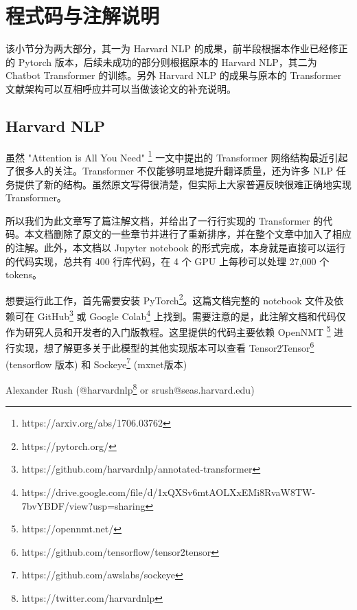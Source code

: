 \section{程式码与注解说明}

该小节分为两大部分，其一为 Harvard NLP 的成果，前半段根据本作业已经修正的 Pytorch 版本，后续未成功的部分则根据原本的 Harvard NLP，其二为 Chatbot Transformer 的训练。另外 Harvard NLP 的成果与原本的 Transformer 文献架构可以互相呼应并可以当做该论文的补充说明。

\subsection{Harvard NLP}

虽然 "Attention is All You Need" \footnote{https://arxiv.org/abs/1706.03762} 一文中提出的 Transformer 网络结构最近引起了很多人的关注。Transformer 不仅能够明显地提升翻译质量，还为许多 NLP 任务提供了新的结构。虽然原文写得很清楚，但实际上大家普遍反映很难正确地实现 Transformer。

所以我们为此文章写了篇注解文档，并给出了一行行实现的 Transformer 的代码。本文档删除了原文的一些章节并进行了重新排序，并在整个文章中加入了相应的注解。此外，本文档以 Jupyter notebook 的形式完成，本身就是直接可以运行的代码实现，总共有 400 行库代码，在 4 个 GPU 上每秒可以处理 27,000 个 tokens。

想要运行此工作，首先需要安装 PyTorch\footnote{https://pytorch.org/}。这篇文档完整的 notebook 文件及依赖可在 GitHub\footnote{https://github.com/harvardnlp/annotated-transformer} 或 Google Colab\footnote{https://drive.google.com/file/d/1xQXSv6mtAOLXxEMi8RvaW8TW-7bvYBDF/view?usp=sharing} 上找到。需要注意的是，此注解文档和代码仅作为研究人员和开发者的入门版教程。这里提供的代码主要依赖 OpenNMT \footnote{https://opennmt.net/} 进行实现，想了解更多关于此模型的其他实现版本可以查看 Tensor2Tensor\footnote{https://github.com/tensorflow/tensor2tensor} (tensorflow 版本) 和 Sockeye\footnote{https://github.com/awslabs/sockeye} (mxnet版本)

Alexander Rush (@harvardnlp\footnote{https://twitter.com/harvardnlp} or srush@seas.harvard.edu)

